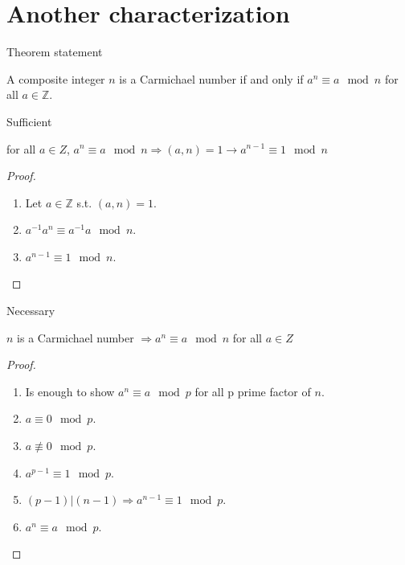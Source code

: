 \documentclass{beamer}
\newcommand{\ZZ}{\mathbb{Z}}
\begin{document}
\section{Another characterization}
\begin{frame}{Theorem statement}
    \begin{theorem}
        A composite integer $n$ is a Carmichael number if and only if $a^n \equiv a \mod{n}$ for all $a \in \ZZ$.
    \end{theorem}
\end{frame}

\begin{frame}{Sufficient}
    \begin{lemma}
       for all $a\in Z$, $a^n \equiv a \mod{n} \Rightarrow (a, n)=1 \to a^{n-1} \equiv 1 \mod{n}$
    \end{lemma}
    \begin{proof}
        \pause\begin{enumerate}
            \item Let $a\in \ZZ$ s.t. $(a, n)=1$.
            \pause\item $a^{-1}a^n \equiv a^{-1}a \mod{n}$.
            \pause\item $a^{n-1} \equiv 1 \mod{n}$.
        \end{enumerate}
    \end{proof}
\end{frame}

\begin{frame}{Necessary}
    \begin{lemma}
        $n$ is a Carmichael number $\Rightarrow a^n \equiv a \mod{n}$ for all $a\in Z$
    \end{lemma}
    \begin{proof}
        \pause\begin{enumerate}
            \item Is enough to show $a^n \equiv a \mod{p}$ for all p prime factor of $n$.
            \pause\item $a\equiv 0 \mod p$.
            \pause\item $a\not\equiv 0 \mod p$.
            \pause\item $a^{p-1}\equiv 1 \mod p$.
            \pause\item $(p - 1) | (n - 1) \Rightarrow a^{n-1}\equiv 1 \mod p$.
            \pause\item $a^{n}\equiv a \mod p$.
        \end{enumerate}
    \end{proof}
\end{frame}
\end{document}

